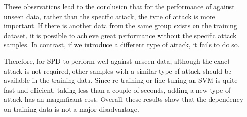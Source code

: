 
These observations lead to the conclusion that for the performance of \methodname{} against unseen data, rather than the specific attack, the type of attack is more important. If there is another data from the same group exists on the training dataset, it is possible to achieve great performance without the specific attack samples. In contrast, if we introduce a different type of attack, it fails to do so.

Therefore, for SPD to perform well against unseen data, although the exact attack is not required, other samples with a similar type of attack should be available in the training data. Since re-training or fine-tuning an SVM is quite fast and efficient, taking less than a couple of seconds, adding a new type of attack has an insignificant cost. Overall, these results show that the dependency on training data is not a major disadvantage.





